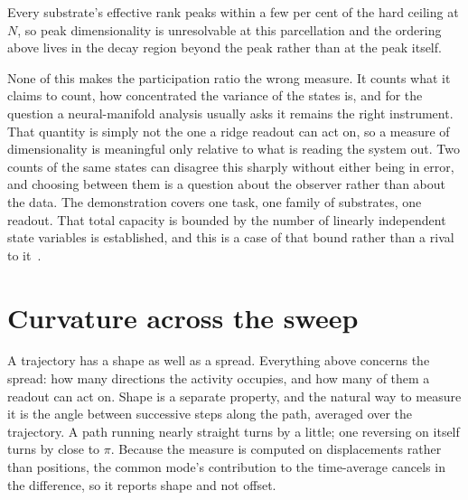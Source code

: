 Every substrate's effective rank peaks within a few per cent of the hard ceiling at
$N$, %
so peak dimensionality is unresolvable at this parcellation and the ordering
above lives in the decay region beyond the peak rather than at the peak itself.

None of this makes the participation ratio the wrong measure. It counts what it
claims to count, how concentrated the variance of the states is, and for the
question a neural-manifold analysis usually asks it remains the right
instrument. That quantity is simply not the one a ridge readout can act on, so a measure of dimensionality is
meaningful only relative to what is reading the system out. Two counts of the
same states can disagree this sharply without either being in error, and
choosing between them is a question about the observer rather than about the
data. The demonstration covers one task, one family of substrates, one readout. That total capacity is bounded by
the number of linearly independent state variables is established, and this is a
case of that bound rather than a rival to
it~\cite{dambre2012information}.







\section{Curvature across the sweep}
\label{sec:act2-temporal}
\bigskip


A trajectory has a shape as well as a spread. Everything above concerns the
spread: how many directions the activity occupies, and how many of them a
readout can act on. Shape is a separate property, and the natural way to measure
it is the angle between successive steps along the path, averaged over the
trajectory. A path running nearly straight turns by a little; one reversing on
itself turns by close to $\pi$. Because the measure is computed on displacements
rather than positions, the common mode's contribution to the time-average
cancels in the difference, so it reports shape and not offset.

